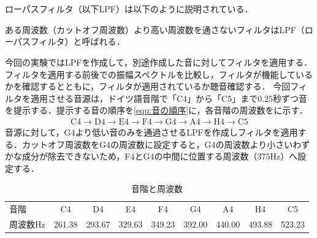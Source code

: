 \section{\kadaibb}\label{sec:\kadaibb}
\purpose
ローパスフィルタ（以下LPF）は以下のように説明されている．
\begin{leftbar}
    ある周波数（カットオフ周波数）より高い周波数を通さないフィルタはLPF（ローパスフィルタ）と呼ばれる．\\\hfill\cite[p.65]{2019matlabで学ぶ実践画像}
\end{leftbar}
今回の実験ではLPFを作成して，別途作成した音に対してフィルタを適用する．
フィルタを適用する前後での振幅スペクトルを比較し，フィルタが機能しているかを確認するとともに，フィルタが適用されているか聴音確認する．
\method
今回フィルタを適用させる音源は，ドイツ語音階で「C4」から「C5」まで\(0.25\)秒ずつ音を提示する．提示する音の順序を\eqref{equ:音の順序}に，各音階の周波数をに示す．
\begin{align}
    \textrm{C4}\to\textrm{D4}\to\textrm{E4}\to\textrm{F4}\to\textrm{G4}\to\textrm{A4}\to\textrm{H4}\to\textrm{C5}\label{equ:音の順序}
\end{align}
音源に対して，G4より低い音のみを通過させるLPFを作成しフィルタを適用する．カットオフ周波数をG4の周波数に設定すると，G4の周波数より小さいわずかな成分が除去できないため，F4とG4の中間に位置する周波数（\(375\textrm{Hz}\)）へ設定する．
\begin{table}[h]
    \centering
    \caption{音階と周波数}
    \label{tbl:音階と周波数}
    \begin{tabularx}{\textwidth}{ACCCCCCCC}
        \hline
        音階                 & C4     & D4     & E4     & F4     & G4     & A4     & H4     & C5     \\
        周波数\(\textrm{Hz}\) & 261.38 & 293.67 & 329.63 & 349.23 & 392.00 & 440.00 & 493.88 & 523.23 \\
        \hline
    \end{tabularx}
\end{table}
